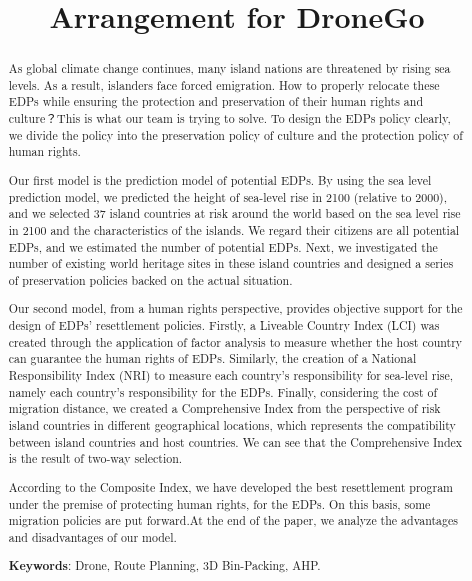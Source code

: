 \documentclass[12pt]{article}  %
\title{Arrangement for DroneGo}  %
\begin{document}
\begin{abstract}

As global climate change continues, many island nations are threatened by rising sea levels. As a result, islanders face forced emigration. How to properly relocate these EDPs while ensuring the protection and preservation of their human rights and culture？This is what our team is trying to solve. To design the EDPs policy clearly, we divide the policy into the preservation policy of culture and the protection policy of human rights.

Our first model is the prediction model of potential EDPs. By using the sea level prediction model, we predicted the height of sea-level rise in 2100 (relative to 2000), and we selected 37 island countries at risk around the world based on the sea level rise in 2100 and the characteristics of the islands. We regard their citizens are all potential EDPs, and we estimated the number of potential EDPs. Next, we investigated the number of existing world heritage sites in these island countries and designed a series of preservation policies backed on the actual situation.

Our second model, from a human rights perspective, provides objective support for the design of EDPs' resettlement policies. Firstly, a Liveable Country Index (LCI) was created through the application of factor analysis to measure whether the host country can guarantee the human rights of EDPs. Similarly, the creation of a National Responsibility Index (NRI) to measure each country's responsibility for sea-level rise, namely each country's responsibility for the EDPs. Finally, considering the cost of migration distance, we created a Comprehensive Index from the perspective of risk island countries in different geographical locations, which represents the compatibility between island countries and host countries. We can see that the Comprehensive Index is the result of two-way selection.

According to the Composite Index, we have developed the best resettlement program under the premise of protecting human rights, for the EDPs. On this basis, some migration policies are put forward.At the end of the paper, we analyze the advantages and disadvantages of our model.


     \vspace{5pt}
     \textbf{Keywords}: Drone, Route Planning, 3D Bin-Packing, AHP.



\end{abstract}
\end{document}
